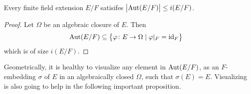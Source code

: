 \documentclass[11pt,a4paper]{article}
\begin{document}
\begin{lemma}
  Every finite field extension $E/F$ satisifes
  $\left\lvert\operatorname{Aut}(E/F)\right\rvert \le i(E/F)$.
\end{lemma}
\begin{proof}
  Let $\Omega$ be an algebraic closure of $E$.
  Then
  \[
    \operatorname{Aut}(E/F) \subseteq
    \left\{\varphi \colon E \to \Omega \mid \varphi\vert_F = \operatorname{id}_F\right\}
  \]
  which is of size $i(E/F)$.
\end{proof}

\begin{remark}
  Geometrically, it is healthy to visualize any element in $\operatorname{Aut}(E/F)$,
  as an $F$-embedding $\sigma$ of $E$ in an algebraically closed $\Omega$,
  such that $\sigma(E) = E$.
  Visualizing is also going to help in the following important proposition.
\end{remark}
\end{document}
